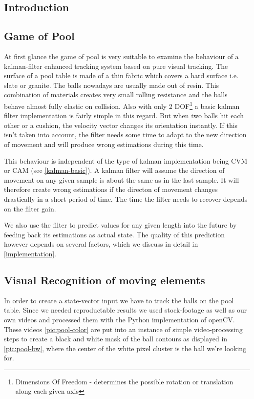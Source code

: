 \documentclass[notitlepage, a4paper, 11pt]{scrartcl}
\begin{document}
\begin{multicols}{2}
\section{Introduction}

\subsection{Game of Pool} \label{intro}

At first glance the game of pool is very suitable to examine the behaviour of a kalman-filter enhanced tracking system based on pure visual tracking. 
The surface of a pool table is made of a thin fabric which covers a hard surface i.e. slate or granite.
The balls nowadays are usually made out of resin. This combination of materials creates very small rolling resistance and the balls behave almost fully elastic on collision.
Also with only 2 DOF\footnote{Dimensions Of Freedom - determines the possible rotation or translation along each given axis} a basic kalman filter implementation is fairly simple in this regard. 
But when two balls hit each other or a cushion, the velocity vector changes its orientation instantly. 
If this isn't taken into account, the filter needs some time to adapt to the new direction of movement and will produce wrong estimations during this time.

This behaviour is independent of the type of kalman implementation being CVM or CAM (see \cref{kalman-basic}).
A kalman filter will assume the direction of movement on any given sample is about the same as in the last sample. 
It will therefore create wrong estimations if the directon of movement changes drastically in a short period of time. The time the filter needs to recover depends on the filter gain.

We also use the filter to predict values for any given length into the future by feeding back its estimations as actual state. 
The quality of this prediction however depends on several factors, which we discuss in detail in \ref{implementation}.

\subsection{Visual Recognition of moving elements}

In order to create a state-vector input we have to track the balls on the pool table. 
Since we needed reproductable results we used stock-footage as well as our own videos and processed them with the Python implementation of openCV.
These videos \cref{pic:pool-color} are put into an instance of simple video-processing steps to create a black and white mask of the ball contours as displayed in \cref{pic:pool-bw},
where the center of the white pixel cluster is the ball we're looking for.


\end{multicols}
\end{document}
